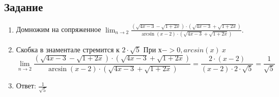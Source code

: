     \subsection*{Задание}
        \begin{enumerate}
            \item Домножим на сопряженное
             $\displaystyle \lim_{n\rightarrow 2} 
        \frac{
               (\sqrt{4x - 3} -
               \sqrt{1 + 2x}) 
               \cdot
               (\sqrt{4x - 3} +
               \sqrt{1 + 2x})
             }
             {
               \arcsin(x-2)
               \cdot
               (\sqrt{4x - 3} +
               \sqrt{1 + 2x})
             }.$
            \item Скобка в знаментале стремится к $2 \cdot \sqrt{5}$
            При $х -> 0, arcsin(x)~x$
            \[
            \lim_{n\rightarrow 2} 
        \frac{
               (\sqrt{4x - 3} -
               \sqrt{1 + 2x}) 
               \cdot
               (\sqrt{4x - 3} +
               \sqrt{1 + 2x})
             }
             {
               \arcsin(x-2)
               \cdot
               (\sqrt{4x - 3} +
               \sqrt{1 + 2x})
             } =
        \frac{
               2 
               \cdot
               (x-2)
             }
             {
               (x-2)
               \cdot
               2 \cdot \sqrt{5}
             } 
             =
            \frac{1}{\sqrt{5}}
             \]
            \item Ответ: $\frac{1}{\sqrt{5}}$
        \end{enumerate}
